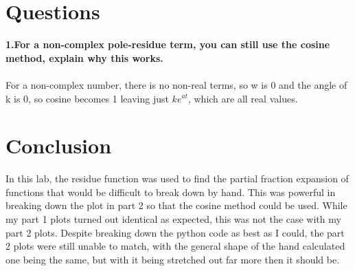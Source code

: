 \documentclass[12pt]{report}
\begin{document}
\section{Questions}
\textbf{1.For a non-complex pole-residue term, you can still use the cosine method, explain why this
works.}
\\ \\For a non-complex number, there is no non-real terms, so w is 0 and the angle of k is 0, so cosine becomes 1 leaving just $ke^{at}$, which are all real values.

\section{Conclusion}
In this lab, the residue function was used to find the partial fraction expansion of functions that would be difficult to break down by hand. This was powerful in breaking down the plot in part 2 so that the cosine method could be used. While my part 1 plots turned out identical as expected, this was not the case with my part 2 plots. Despite breaking down the python code as best as I could, the part 2 plots were still unable to match, with the general shape of the hand calculated one being the same, but with it being stretched out far more then it should be.
\end{document}

